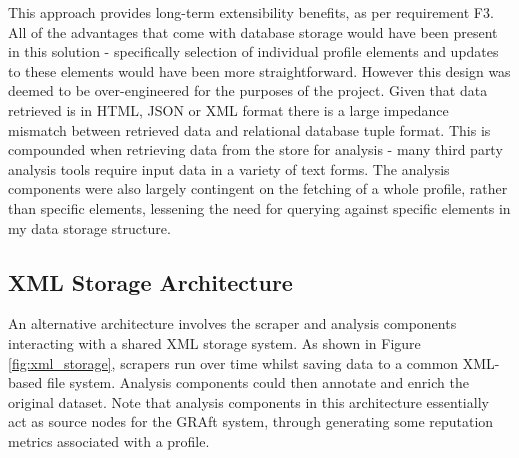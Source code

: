 This approach provides long-term extensibility benefits, as per requirement F3. All of the advantages that come with database storage would have been present in this solution -
specifically selection of individual profile elements and updates to these elements would have been more straightforward. However this design was deemed to be over-engineered for the purposes of the project. Given that data retrieved is in HTML, JSON or XML format there is a large impedance mismatch between retrieved data and relational database tuple format. This is compounded when retrieving data from the store for analysis - many third party analysis tools require input data in a variety of text forms.  The analysis components were also largely contingent on the fetching of a whole profile, rather than specific elements, lessening the need for querying against specific elements in my data storage structure. 

\subsection{XML Storage Architecture}

An alternative architecture involves the scraper and analysis components interacting with a shared XML storage system. As shown in Figure \ref{fig:xml_storage}, scrapers run over time whilst saving data to a common XML-based file system. Analysis components could then annotate and enrich the original dataset. Note that analysis components in this architecture essentially act as source nodes for the GRAft system, through generating some reputation metrics associated with a profile. 

